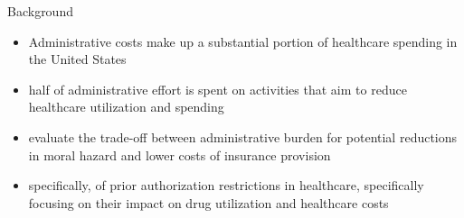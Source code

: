 \begin{frame}{Background}
    \begin{itemize}
        \item Administrative costs make up a substantial portion of healthcare spending in the United States
        \item half of administrative effort is spent on activities that aim to reduce healthcare utilization and spending
        \item evaluate the trade-off between administrative burden for potential reductions in moral hazard and lower costs of insurance provision
        \item specifically, of prior authorization restrictions in healthcare, specifically focusing on their impact on drug utilization and healthcare costs
    \end{itemize}
    
\end{frame}